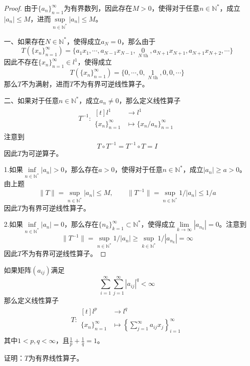 \documentclass[lang = cn, scheme = chinese, 10pt]{elegantbook}
\newcommand{\N}{\mathbb{N}}  %
\newcommand{\sub}{\subset}   %
\begin{document}
\begin{proof}
	由于$\{ a_n \}_{n=1}^{\infty}$为有界数列，因此存在$M>0$，使得对于任意$n\in\N^*$，成立$|a_n|\le M$，进而$\sup\limits_{n\in\N^*}|a_n|\le M$。
	
	一、如果存在$N\in\N^*$，使得成立$a_N=0$，那么由于
	$$
	T(\{ x_n \}_{n=1}^{\infty})=\{ a_1x_1,\cdots,a_{N-1}x_{N-1},\mathop{0}\limits_{N \text{ th}},a_{N+1}x_{N+1},a_{N+1}x_{N+2},\cdots \}
	$$
	因此不存在$\{ x_n \}_{n=1}^{\infty}\in l^1$，使得成立
	$$
	T(\{ x_n \}_{n=1}^{\infty})=\{ 0,\cdots,0,\mathop{1}\limits_{N \text{ th}},0,0,\cdots \}
	$$
	那么$T$不为满射，进而$T$不为有界可逆线性算子。
	
	二、如果对于任意$n\in\N^*$，成立$a_n\ne0$，那么定义线性算子
	\nonumber\begin{align}
		T^{-1}:\begin{aligned}[t]
			l^1&\longrightarrow l^1\\
			\{ x_n \}_{n=1}^{\infty}&\longmapsto \{ x_n/a_n \}_{n=1}^{\infty}
		\end{aligned}
	\end{align}
	注意到
	$$
	T\circ T^{-1}=T^{-1}\circ T=I
	$$
	因此$T$为可逆算子。
	
	1.如果$\inf\limits_{n\in\N^*}|a_n|>0$，那么存在$a>0$，使得对于任意$n\in\N^*$，成立$|a_n|\ge a>0$。由上题
	$$
	\|T\|=\sup_{n\in\N^*}|a_n|\le M,\qquad \|T^{-1}\|=\sup_{n\in\N^*}1/|a_n|\le 1/a
	$$
	因此$T$为有界可逆线性算子。
	
	2.如果$\inf\limits_{n\in\N^*}|a_n|=0$，那么存在$\{ n_k \}_{k=1}^{\infty}\sub\N^*$，使得成立$\lim\limits_{k\to\infty}|a_{n_k}|=0$。注意到
	$$
	\|T^{-1}\|=\sup_{n\in\N^*}1/|a_n|\ge \sup_{k\in\N^*}1/|a_{n_k}|=\infty
	$$
	因此$T$不为有界可逆线性算子。
\end{proof}

\begin{proposition}
	如果矩阵$(a_{ij})$满足
	$$
	\sum_{i=1}^{\infty}\sum_{j=1}^{\infty}|a_{ij}|^q<\infty
	$$
	那么定义线性算子
	\nonumber\begin{align}
		T:\begin{aligned}[t]
			l^p&\longrightarrow l^q\\
			\{x_n\}_{n=1}^{\infty}&\longmapsto \left\{ \sum_{j=1}^{\infty}a_{ij}x_j \right\}_{i=1}^{\infty}
		\end{aligned}
	\end{align}
	其中$1<p,q<\infty$，且$\frac{1}{p}+\frac{1}{q}=1$。
	
	证明：$T$为有界线性算子。
\end{proposition}
\end{document}
